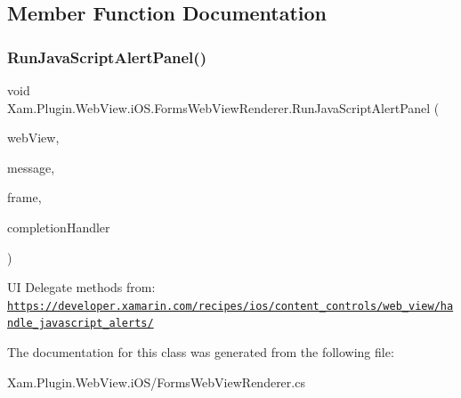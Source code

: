 \subsection{Member Function Documentation}
\mbox{\label{class_xam_1_1_plugin_1_1_web_view_1_1i_o_s_1_1_forms_web_view_renderer_a74b08686bd11dcc71f52cd9908205c0a}} 
\subsubsection{\texorpdfstring{Run\+Java\+Script\+Alert\+Panel()}{RunJavaScriptAlertPanel()}}
{\footnotesize\ttfamily void Xam.\+Plugin.\+Web\+View.\+i\+O\+S.\+Forms\+Web\+View\+Renderer.\+Run\+Java\+Script\+Alert\+Panel (\begin{DoxyParamCaption}\item[{Web\+Kit.\+W\+K\+Web\+View}]{web\+View,  }\item[{string}]{message,  }\item[{W\+K\+Frame\+Info}]{frame,  }\item[{Action}]{completion\+Handler }\end{DoxyParamCaption})}

UI Delegate methods from\+: \href{https://developer.xamarin.com/recipes/ios/content_controls/web_view/handle_javascript_alerts/}{\tt https\+://developer.\+xamarin.\+com/recipes/ios/content\+\_\+controls/web\+\_\+view/handle\+\_\+javascript\+\_\+alerts/} 

The documentation for this class was generated from the following file\+:\begin{DoxyCompactItemize}
\item 
Xam.\+Plugin.\+Web\+View.\+i\+O\+S/Forms\+Web\+View\+Renderer.\+cs\end{DoxyCompactItemize}
